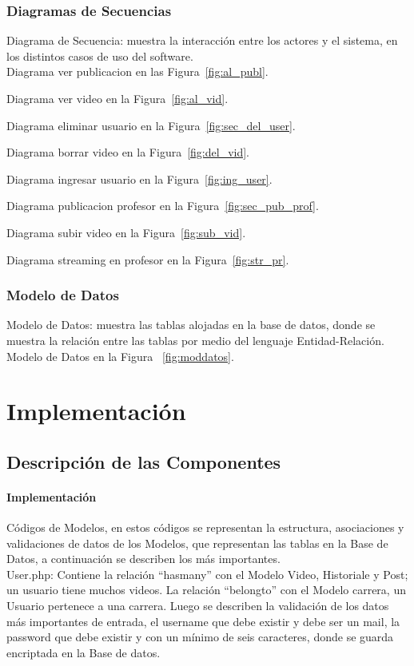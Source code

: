 \documentclass[12pt]{article}
\begin{document}
\subsubsection{Diagramas de Secuencias}
Diagrama de Secuencia: muestra la interacción entre los actores y el sistema, en los distintos casos de uso
del software.\\

Diagrama ver publicacion en las Figura~\ref{fig:al_publ}.

Diagrama ver video en la Figura~\ref{fig:al_vid}.

Diagrama eliminar usuario en la Figura~\ref{fig:sec_del_user}.

Diagrama borrar video en la Figura~\ref{fig:del_vid}.

Diagrama ingresar usuario en la Figura~\ref{fig:ing_user}.

Diagrama publicacion profesor en la Figura~\ref{fig:sec_pub_prof}.

Diagrama subir video en la Figura~\ref{fig:sub_vid}.

Diagrama streaming en profesor en la Figura~\ref{fig:str_pr}.


\subsubsection{Modelo de Datos}
Modelo de Datos: muestra las tablas alojadas en la base de datos, donde se muestra la relación entre las 
tablas por medio del lenguaje Entidad-Relación. \\

Modelo de Datos en la Figura ~\ref{fig:moddatos}.



\newpage
\section{Implementación}
\subsection{Descripción de las Componentes}
\paragraph{Implementación\\}
Códigos de Modelos, en estos códigos se representan la estructura, asociaciones y validaciones de datos de los 
Modelos, que representan las tablas en la Base de Datos, a continuación se describen los más importantes.\\
User.php: Contiene la relación ``hasmany''  con el Modelo Video, Historiale y Post;  un usuario tiene muchos videos.
La relación ``belongto'' con el Modelo carrera, un Usuario pertenece a una carrera. Luego se describen la validación 
de los datos más importantes de entrada, el username que debe existir y debe ser un mail, la password que debe 
existir y con un mínimo de seis caracteres, donde se guarda encriptada en la Base de datos.\\
\end{document}
